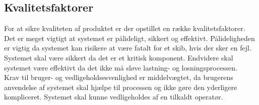 \subsection{Kvalitetsfaktorer}
For at sikre kvaliteten af produktet er der opstillet en række kvalitetsfaktorer. Det er meget vigtigt at systemet er pålideligt, sikkert og effektivt. Pålideligheden er vigtig da systemet kan risikere at være fatalt for et skib, hvis der sker en fejl. Systemet skal være sikkert da det er et kritisk komponent. Endvidere skal systemet være effektivt da det ikke må sløve lastning- og losningsprocessen.\\
Krav til bruger- og vedligeholdsesvenlighed er middelvægtet, da brugerens anvendelse af systemet skal hjælpe til processen og ikke gøre den yderligere kompliceret. Systemet skal kunne vedligeholdes af en tilkaldt operatør.\\

